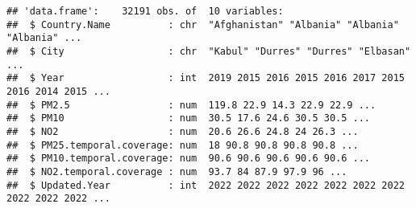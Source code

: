 \documentclass[
]{article}
\newenvironment{Shaded}{\begin{snugshade}}{\end{snugshade}}
\newcommand{\AttributeTok}[1]{\textcolor[rgb]{0.77,0.63,0.00}{#1}}
\newcommand{\ConstantTok}[1]{\textcolor[rgb]{0.00,0.00,0.00}{#1}}
\newcommand{\FloatTok}[1]{\textcolor[rgb]{0.00,0.00,0.81}{#1}}
\newcommand{\FunctionTok}[1]{\textcolor[rgb]{0.00,0.00,0.00}{#1}}
\newcommand{\NormalTok}[1]{#1}
\newcommand{\OtherTok}[1]{\textcolor[rgb]{0.56,0.35,0.01}{#1}}
\newcommand{\SpecialCharTok}[1]{\textcolor[rgb]{0.00,0.00,0.00}{#1}}
\begin{document}
\begin{Shaded}
\end{Shaded}

\begin{verbatim}
## 'data.frame':    32191 obs. of  10 variables:
##  $ Country.Name          : chr  "Afghanistan" "Albania" "Albania" "Albania" ...
##  $ City                  : chr  "Kabul" "Durres" "Durres" "Elbasan" ...
##  $ Year                  : int  2019 2015 2016 2015 2016 2017 2015 2016 2014 2015 ...
##  $ PM2.5                 : num  119.8 22.9 14.3 22.9 22.9 ...
##  $ PM10                  : num  30.5 17.6 24.6 30.5 30.5 ...
##  $ NO2                   : num  20.6 26.6 24.8 24 26.3 ...
##  $ PM25.temporal.coverage: num  18 90.8 90.8 90.8 90.8 ...
##  $ PM10.temporal.coverage: num  90.6 90.6 90.6 90.6 90.6 ...
##  $ NO2.temporal.coverage : num  93.7 84 87.9 97.9 96 ...
##  $ Updated.Year          : int  2022 2022 2022 2022 2022 2022 2022 2022 2022 2022 ...
\end{verbatim}
\end{document}
